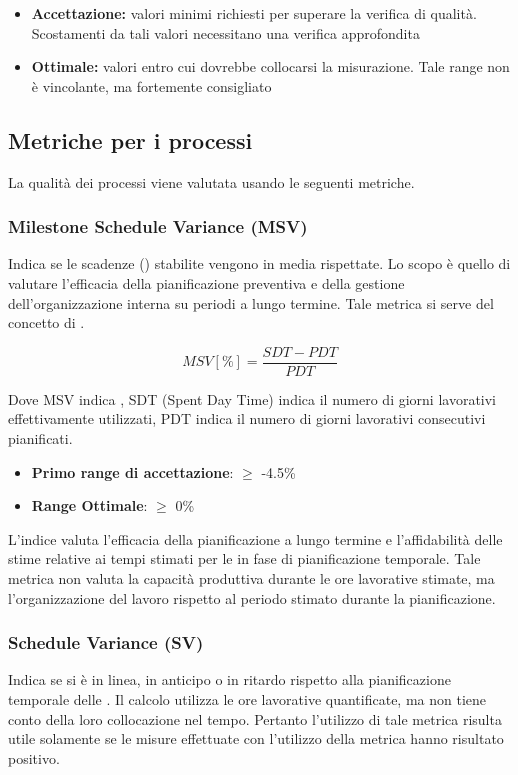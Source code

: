 \documentclass[12pt,a4paper]{article}
\begin{document}
	\begin{itemize}
		\item \textbf{Accettazione:} valori minimi richiesti per superare la verifica di qualità. Scostamenti da tali valori necessitano una verifica approfondita
		\item \textbf{Ottimale:} valori entro cui dovrebbe collocarsi la misurazione. Tale range non è vincolante, ma fortemente consigliato
	\end{itemize}
	
	\subsection{Metriche per i processi}\label{metriche_processi}
	La qualità dei processi viene valutata usando le seguenti metriche.
	
	\subsubsection{Milestone Schedule Variance (MSV)}
	Indica se le scadenze () stabilite vengono in media rispettate. Lo scopo è quello di valutare l'efficacia della pianificazione preventiva e della gestione dell'organizzazione interna su periodi a lungo termine. Tale metrica si serve del concetto di .
	
	\[MSV [\%] = \frac{SDT - PDT}{PDT}\]
	
	Dove  MSV indica , SDT (Spent Day Time) indica il numero di giorni lavorativi effettivamente utilizzati, PDT indica il numero di giorni lavorativi consecutivi pianificati.
	
	\begin{itemize}
		\item \textbf{Primo range di accettazione}: $\geq$ -4.5\%
		\item \textbf{Range Ottimale}: $\geq$ 0\%
	\end{itemize}
	
	L'indice  valuta l'efficacia della pianificazione a lungo termine e l'affidabilità delle stime relative ai tempi stimati per le   in fase di pianificazione temporale. Tale metrica non valuta la capacità produttiva durante le ore lavorative stimate, ma l'organizzazione del lavoro rispetto al periodo stimato durante la pianificazione.
	
	\subsubsection{Schedule Variance (SV)} \label{schedule_variance}
	Indica se si è in linea, in anticipo o in ritardo rispetto alla pianificazione temporale delle . Il calcolo utilizza le ore lavorative quantificate, ma non tiene conto della loro collocazione nel tempo. Pertanto l'utilizzo di tale metrica risulta utile solamente se le misure effettuate con l'utilizzo della metrica  hanno risultato positivo.
	
\end{document}
